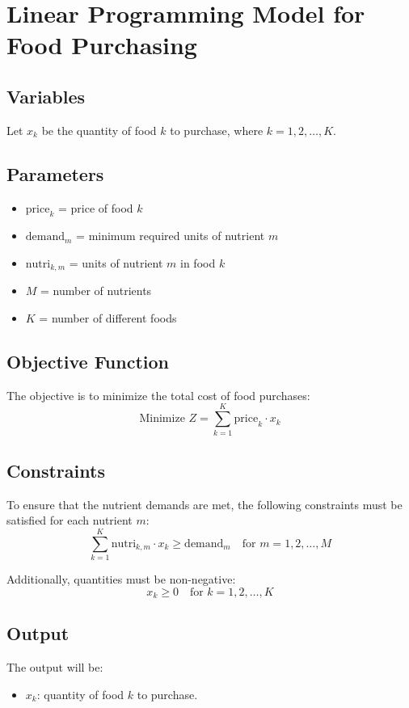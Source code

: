\documentclass{article}
\begin{document}
\section*{Linear Programming Model for Food Purchasing}

\subsection*{Variables}
Let \( x_k \) be the quantity of food \( k \) to purchase, where \( k = 1, 2, \ldots, K \).

\subsection*{Parameters}
\begin{itemize}
    \item \( \text{price}_k \)  = price of food \( k \)
    \item \( \text{demand}_m \) = minimum required units of nutrient \( m \)
    \item \( \text{nutri}_{k, m} \) = units of nutrient \( m \) in food \( k \)
    \item \( M \) = number of nutrients
    \item \( K \) = number of different foods
\end{itemize}

\subsection*{Objective Function}
The objective is to minimize the total cost of food purchases:
\[
\text{Minimize } Z = \sum_{k=1}^{K} \text{price}_k \cdot x_k
\]

\subsection*{Constraints}
To ensure that the nutrient demands are met, the following constraints must be satisfied for each nutrient \( m \):
\[
\sum_{k=1}^{K} \text{nutri}_{k, m} \cdot x_k \geq \text{demand}_m \quad \text{for } m = 1, 2, \ldots, M
\]

Additionally, quantities must be non-negative:
\[
x_k \geq 0 \quad \text{for } k = 1, 2, \ldots, K
\]

\subsection*{Output}
The output will be:
\begin{itemize}
    \item \( x_k \): quantity of food \( k \) to purchase.
\end{itemize}
\end{document}
